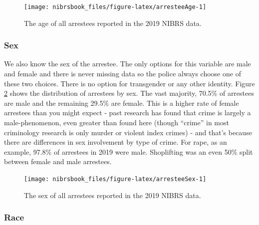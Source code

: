 \documentclass[
  12pt,
  openany]{book}
\begin{document}
\begin{figure}

{\centering \texttt{[image: nibrsbook\_files/figure-latex/arresteeAge-1]} 

}

\caption{The age of all arrestees reported in the 2019 NIBRS data.}\label{fig:arresteeAge}
\end{figure}

\hypertarget{sex-2}{%
\subsubsection{Sex}\label{sex-2}}

We also know the sex of the arrestee. The only options for this variable are male and female and there is never missing data so the police always choose one of these two choices. There is no option for transgender or any other identity. Figure \ref{fig:arresteeSex} shows the distribution of arrestees by sex. The vast majority, 70.5\% of arrestees are male and the remaining 29.5\% are female. This is a higher rate of female arrestees than you might expect - past research has found that crime is largely a male-phenomenon, even greater than found here (though ``crime'' in most criminology research is only murder or violent index crimes) - and that's because there are differences in sex involvement by type of crime. For rape, as an example, 97.8\% of arrestees in 2019 were male. Shoplifting was an even 50\% split between female and male arrestees.

\begin{figure}

{\centering \texttt{[image: nibrsbook\_files/figure-latex/arresteeSex-1]} 

}

\caption{The sex of all arrestees reported in the 2019 NIBRS data.}\label{fig:arresteeSex}
\end{figure}

\hypertarget{race-2}{%
\subsubsection{Race}\label{race-2}}
\end{document}
